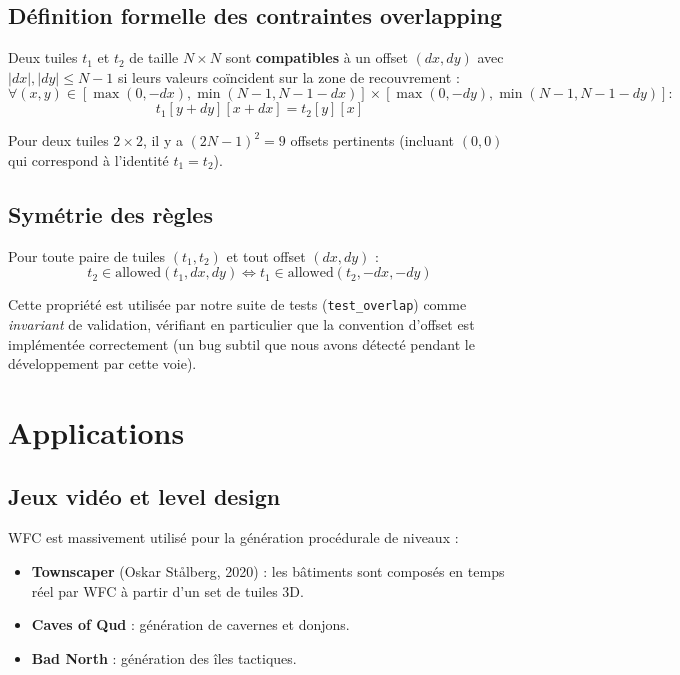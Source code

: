 \subsection{Définition formelle des contraintes overlapping}

\begin{definition}
Deux tuiles $t_1$ et $t_2$ de taille $N \times N$ sont \textbf{compatibles} à un offset $(dx, dy)$ avec $|dx|, |dy| \leq N - 1$ si leurs valeurs coïncident sur la zone de recouvrement :
\[
\forall (x, y) \in [\max(0, -dx), \min(N-1, N-1-dx)] \times [\max(0, -dy), \min(N-1, N-1-dy)] :
\]
\[
t_1[y + dy][x + dx] = t_2[y][x]
\]
\end{definition}

Pour deux tuiles $2 \times 2$, il y a $(2N - 1)^2 = 9$ offsets pertinents (incluant $(0, 0)$ qui correspond à l'identité $t_1 = t_2$).

\subsection{Symétrie des règles}

\begin{theorem}
Pour toute paire de tuiles $(t_1, t_2)$ et tout offset $(dx, dy)$ :
\[
t_2 \in \text{allowed}(t_1, dx, dy) \iff t_1 \in \text{allowed}(t_2, -dx, -dy)
\]
\end{theorem}

Cette propriété est utilisée par notre suite de tests (\texttt{test\_overlap}) comme \textit{invariant} de validation, vérifiant en particulier que la convention d'offset est implémentée correctement (un bug subtil que nous avons détecté pendant le développement par cette voie).

\section{Applications}
\label{sec:wfc:applications}

\subsection{Jeux vidéo et level design}

WFC est massivement utilisé pour la génération procédurale de niveaux :
\begin{itemize}
    \item \textbf{Townscaper} (Oskar Stålberg, 2020) : les bâtiments sont composés en temps réel par WFC à partir d'un set de tuiles 3D.
    \item \textbf{Caves of Qud} : génération de cavernes et donjons.
    \item \textbf{Bad North} : génération des îles tactiques.
\end{itemize}

